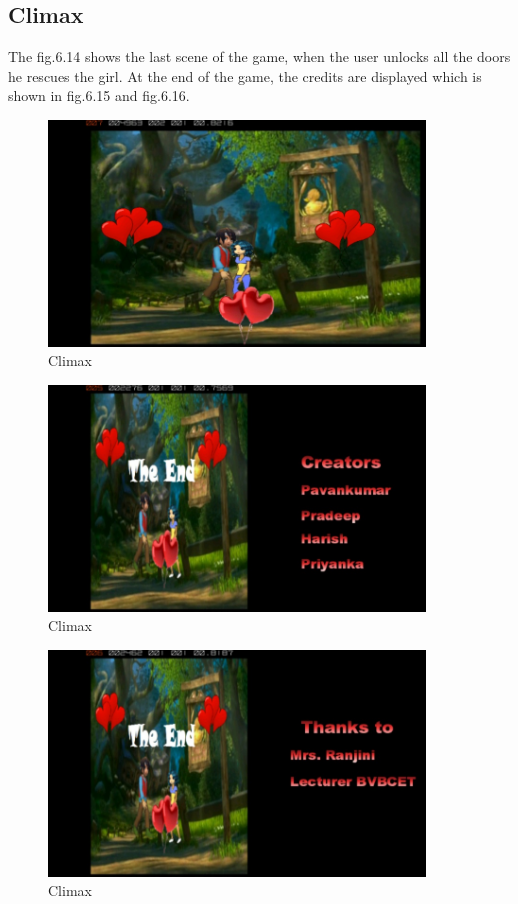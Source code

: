 \subsection{Climax}
\hspace{1cm}The fig.6.14  shows the last scene of the game, when the user unlocks all the doors he rescues the girl.
At the end of the game, the credits are displayed which is shown in fig.6.15 and fig.6.16.
 

\begin{figure}[htbp]
	\centering
	\includegraphics[width=10cm,height=6cm]{15.jpg}
	\caption{Climax}
\end{figure}
\begin{figure}[htbp]
	\centering
	\includegraphics[width=10cm,height=6cm]{16.jpg}
	\caption{Climax}
\end{figure}
\begin{figure}[htbp]
	\centering
	\includegraphics[width=10cm,height=6cm]{17.jpg}
	\caption{Climax}
\end{figure}
